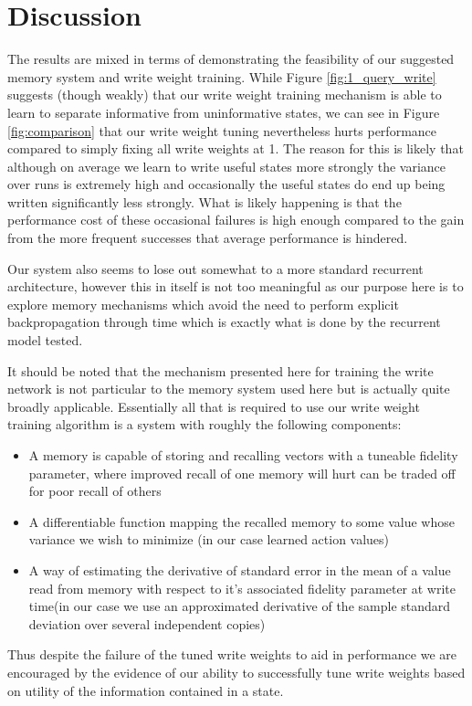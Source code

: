 \documentclass{article}
\begin{document}
\section*{Discussion}
The results are mixed in terms of demonstrating the feasibility of our suggested memory system and write weight training. While Figure \ref{fig:1_query_write} suggests (though weakly) that our write weight training mechanism is able to learn to separate informative from uninformative states, we can see in Figure \ref{fig:comparison} that our write weight tuning nevertheless hurts performance compared to simply fixing all write weights at 1. The reason for this is likely that although on average we learn to write useful states more strongly the variance over runs is extremely high and occasionally the useful states do end up being written significantly less strongly. What is likely happening is that the performance cost of these occasional failures is high enough compared to the gain from the more frequent successes that average performance is hindered. 

Our system also seems to lose out somewhat to a more standard recurrent architecture, however this in itself is not too meaningful as our purpose here is to explore memory mechanisms which avoid the need to perform explicit backpropagation through time which is exactly what is done by the recurrent model tested.

It should be noted that the mechanism presented here for training the write network is not particular to the memory system used here but is actually quite broadly applicable. Essentially all that is required to use our write weight training algorithm is a system with roughly the following components:
\begin{itemize}
\item A memory is capable of storing and recalling vectors with a tuneable fidelity parameter, where improved recall of one memory will hurt can be traded off for poor recall of others
\item A differentiable function mapping the recalled memory to some value whose variance we wish to minimize (in our case learned action values)
\item A way of estimating the derivative of standard error in the mean of a value read from memory with respect to it's associated fidelity parameter at write time(in our case we use an approximated derivative of the sample standard deviation over several independent copies)
\end{itemize}
Thus despite the failure of the tuned write weights to aid in performance we are encouraged by the evidence of our ability to successfully tune write weights based on utility of the information contained in a state.
\end{document}
